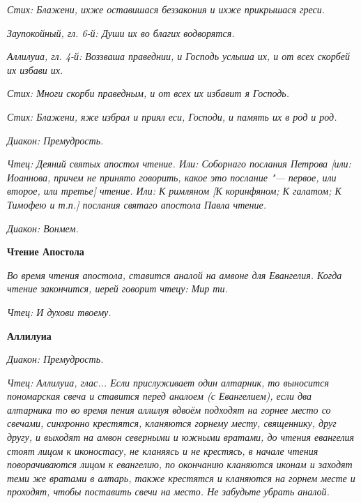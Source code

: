 \itshape Стих:\normalfont{} Блажени, ихже оставишася беззакония и ихже прикрышася греси.


\itshape Заупокойный, гл. 6-й:\normalfont{} Души их во благих водворятся.


\itshape Аллилуиа, гл. 4-й:\normalfont{} Воззваша праведнии, и Господь услыша их, и от всех скорбей их избави их.


\itshape Стих:\normalfont{} Многи скорби праведным, и от всех их избавит я Господь.


\itshape Стих:\normalfont{} Блажени, яже избрал и приял еси, Господи, и память их в род и род.


\itshape Диакон:\normalfont{} Премудрость.


\itshape Чтец:\normalfont{} Деяний святых апостол чтение. \itshape Или:\normalfont{} Соборнаго послания Петрова \itshape [или:\normalfont{} Иоаннова\itshape , причем не принято говорить, какое это послание "--- первое, или второе, или третье\normalfont{}] чтение. \itshape Или:\normalfont{} К римляном [К коринфяном; К галатом; К Тимофею \itshape и т.п.\normalfont{}] послания святаго апостола Павла чтение.


\itshape Диакон:\normalfont{} Вонмем.





\bfseries Чтение Апостола\normalfont{}


\itshape Во время чтения апостола, ставится аналой на амвоне для Евангелия. Когда чтение закончится, иерей говорит чтецу:\normalfont{} Мир ти.


\itshape Чтец:\normalfont{} И духови твоему.





\bfseries Аллилуиа\normalfont{}


\itshape Диакон:\normalfont{} Премудрость.


\itshape Чтец:\normalfont{} Аллилуиа, глас... \itshape Если прислуживает один алтарник, то выносится пономарская свеча и ставится перед аналоем (с Евангелием), если два алтарника то во время пения аллилуя вдвоём подходят на горнее место со свечами, синхронно крестятся, кланяются горнему месту, священнику, друг другу, и выходят на амвон северными и южными вратами, до чтения евангелия стоят лицом к иконостасу, не кланяясь и не крестясь, в начале чтения поворачиваются лицом к евангелию, по окончанию кланяются иконам и заходят теми же вратами в алтарь, также крестятся и кланяются на горнем месте и проходят, чтобы поставить свечи на место. Не забудьте убрать аналой.\normalfont{}


